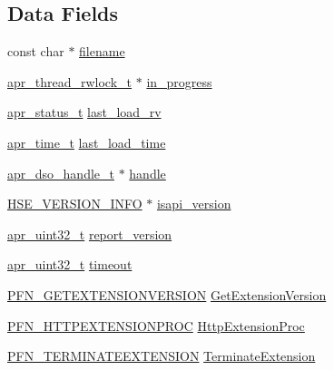 \subsection*{Data Fields}
\begin{DoxyCompactItemize}
\item 
const char $\ast$ \hyperlink{structisapi__loaded_ae9ff7125e0407c6c32f7cd1e33da45f4}{filename}
\item 
\hyperlink{structapr__thread__rwlock__t}{apr\+\_\+thread\+\_\+rwlock\+\_\+t} $\ast$ \hyperlink{structisapi__loaded_a71f9d71ec5de771d823702984e68de71}{in\+\_\+progress}
\item 
\hyperlink{group__apr__errno_gaa5105fa83cc322f09382292db8b47593}{apr\+\_\+status\+\_\+t} \hyperlink{structisapi__loaded_a0b375ce554f5e731aae2db1395c19df1}{last\+\_\+load\+\_\+rv}
\item 
\hyperlink{group__apr__time_gadb4bde16055748190eae190c55aa02bb}{apr\+\_\+time\+\_\+t} \hyperlink{structisapi__loaded_a501ed94f7ccec3529a9618b3745e1945}{last\+\_\+load\+\_\+time}
\item 
\hyperlink{structapr__dso__handle__t}{apr\+\_\+dso\+\_\+handle\+\_\+t} $\ast$ \hyperlink{structisapi__loaded_a0ead9a2a4fcdae90b5606ade0e722fd3}{handle}
\item 
\hyperlink{structHSE__VERSION__INFO}{H\+S\+E\+\_\+\+V\+E\+R\+S\+I\+O\+N\+\_\+\+I\+N\+FO} $\ast$ \hyperlink{structisapi__loaded_a7812cb5b50c3c08eeead6aca1c241696}{isapi\+\_\+version}
\item 
\hyperlink{group__apr__platform_ga558548a135d8a816c4787250744ea147}{apr\+\_\+uint32\+\_\+t} \hyperlink{structisapi__loaded_a1719a4c7dcc25772d3512660fb100d65}{report\+\_\+version}
\item 
\hyperlink{group__apr__platform_ga558548a135d8a816c4787250744ea147}{apr\+\_\+uint32\+\_\+t} \hyperlink{structisapi__loaded_a61a461d72de136e64f159165a3b0deed}{timeout}
\item 
\hyperlink{group__MOD__ISAPI_gae1915269bef3b791c1b876144f066e29}{P\+F\+N\+\_\+\+G\+E\+T\+E\+X\+T\+E\+N\+S\+I\+O\+N\+V\+E\+R\+S\+I\+ON} \hyperlink{structisapi__loaded_a6095bed8064b4a3658606f2b6bb805e7}{Get\+Extension\+Version}
\item 
\hyperlink{group__MOD__ISAPI_gae198ae4c18c63385512ff7e8492524f6}{P\+F\+N\+\_\+\+H\+T\+T\+P\+E\+X\+T\+E\+N\+S\+I\+O\+N\+P\+R\+OC} \hyperlink{structisapi__loaded_ab2a535b76e78dd7a9133564aea606ecf}{Http\+Extension\+Proc}
\item 
\hyperlink{group__MOD__ISAPI_ga952f8bc8dd87aa9ea5457c7f21536e95}{P\+F\+N\+\_\+\+T\+E\+R\+M\+I\+N\+A\+T\+E\+E\+X\+T\+E\+N\+S\+I\+ON} \hyperlink{structisapi__loaded_a5d171f49a40e1d0278788a8885ddef79}{Terminate\+Extension}
\end{DoxyCompactItemize}


